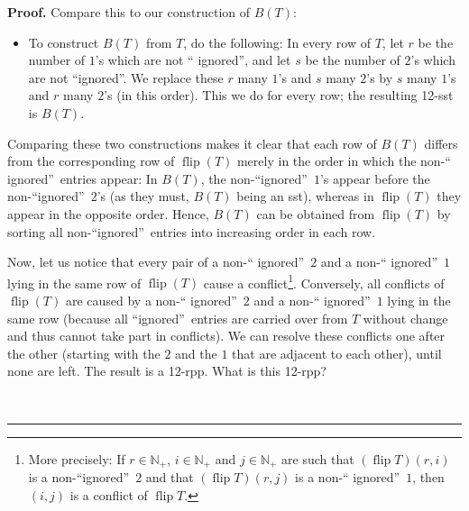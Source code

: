 \documentclass[numbers=enddot,12pt,final,onecolumn,notitlepage]{scrartcl}%
\theoremstyle{definition}
\newenvironment{proof}[1][Proof]{\noindent\textbf{#1.} }{\ \rule{0.5em}{0.5em}}
\begin{document}
\begin{proof}
Compare this to our construction of $B\left(  T\right)  $:

\begin{itemize}
\item To construct $B\left(  T\right)  $ from $T$, do the following: In every
row of $T$, let $r$ be the number of $1$'s which are not \textquotedblleft
ignored\textquotedblright, and let $s$ be the number of $2$'s which are not
\textquotedblleft ignored\textquotedblright. We replace these $r$ many $1$'s
and $s$ many $2$'s by $s$ many $1$'s and $r$ many $2$'s (in this order). This
we do for every row; the resulting 12-sst is $B\left(  T\right)  $.
\end{itemize}

Comparing these two constructions makes it clear that each row of $B\left(
T\right)  $ differs from the corresponding row of $\operatorname*{flip}\left(
T\right)  $ merely in the order in which the non-\textquotedblleft
ignored\textquotedblright\ entries appear: In $B\left(  T\right)  $, the
non-\textquotedblleft ignored\textquotedblright\ $1$'s appear before the
non-\textquotedblleft ignored\textquotedblright\ $2$'s (as they must,
$B\left(  T\right)  $ being an sst), whereas in $\operatorname*{flip}\left(
T\right)  $ they appear in the opposite order. Hence, $B\left(  T\right)  $
can be obtained from $\operatorname*{flip}\left(  T\right)  $ by sorting all
non-\textquotedblleft ignored\textquotedblright\ entries into increasing order
in each row.

Now, let us notice that every pair of a non-\textquotedblleft
ignored\textquotedblright\ $2$ and a non-\textquotedblleft
ignored\textquotedblright\ $1$ lying in the same row of $\operatorname*{flip}%
\left(  T\right)  $ cause a conflict\footnote{More precisely: If
$r\in\mathbb{N}_{+}$, $i\in\mathbb{N}_{+}$ and $j\in\mathbb{N}_{+}$ are such
that $\left(  \operatorname*{flip}T\right)  \left(  r,i\right)  $ is a
non-\textquotedblleft ignored\textquotedblright\ $2$ and that $\left(
\operatorname*{flip}T\right)  \left(  r,j\right)  $ is a non-\textquotedblleft
ignored\textquotedblright\ $1$, then $\left(  i,j\right)  $ is a conflict of
$\operatorname*{flip}T$.}. Conversely, all conflicts of $\operatorname*{flip}%
\left(  T\right)  $ are caused by a non-\textquotedblleft
ignored\textquotedblright\ $2$ and a non-\textquotedblleft
ignored\textquotedblright\ $1$ lying in the same row (because all
\textquotedblleft ignored\textquotedblright\ entries are carried over from $T$
without change and thus cannot take part in conflicts). We can resolve these
conflicts one after the other (starting with the $2$ and the $1$ that are
adjacent to each other), until none are left. The result is a 12-rpp. What is
this 12-rpp?


\end{proof}
\end{document}
